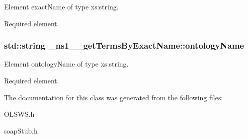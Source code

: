 Element exactName of type xs:string. 

Required element. \hypertarget{class__ns1____getTermsByExactName_a18c7a192bfb3aed0166fee7d8bcfbf71}{
\subsubsection[{ontologyName}]{\setlength{\rightskip}{0pt plus 5cm}std::string {\bf \_\-ns1\_\-\_\-getTermsByExactName::ontologyName}}}
\label{class__ns1____getTermsByExactName_a18c7a192bfb3aed0166fee7d8bcfbf71}


Element ontologyName of type xs:string. 

Required element. 

The documentation for this class was generated from the following files:\begin{DoxyCompactItemize}
\item 
OLSWS.h\item 
soapStub.h\end{DoxyCompactItemize}
